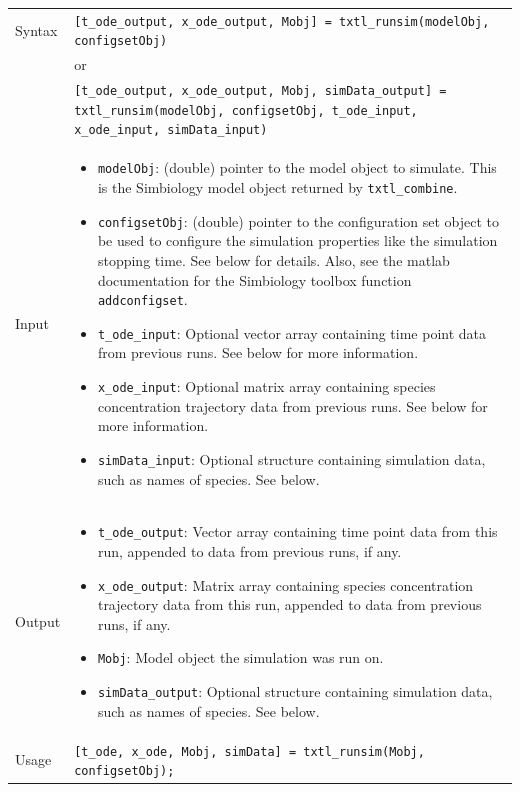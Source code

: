 \documentclass[english]{report}
\begin{document}
		\begin{tabular}{p{2cm}|p{13cm}}
			Syntax & \texttt{[t\_ode\_output, x\_ode\_output, Mobj] = txtl\_runsim(modelObj, configsetObj)}\\
			& or \\
			& \texttt{[t\_ode\_output, x\_ode\_output, Mobj, simData\_output] = txtl\_runsim(modelObj, configsetObj, t\_ode\_input, x\_ode\_input, simData\_input)}\\ \hline
			Input &  \begin{itemize}
				\item \texttt{modelObj}: (double) pointer to the model object to simulate. This is the Simbiology model object returned by \texttt{txtl\_combine}.
				\item \texttt{configsetObj}: (double) pointer to the configuration set object to be used to configure the simulation properties like the simulation stopping time. See below for details. Also, see the matlab documentation for the Simbiology toolbox function \texttt{addconfigset}. 
				\item \texttt{t\_ode\_input}: Optional vector array containing time point data from previous runs. See below for more information. 
				\item \texttt{x\_ode\_input}: Optional matrix array containing species concentration trajectory data from previous runs. See below for more information.
				\item \texttt{simData\_input}: Optional structure containing simulation data, such as names of species. See below.   
				\end{itemize} \\ \hline
			Output & \begin{itemize}
				\item \texttt{t\_ode\_output}: Vector array containing time point data from this run, appended to data from previous runs, if any. 
				\item \texttt{x\_ode\_output}: Matrix array containing species concentration trajectory data from this run, appended to data from previous runs, if any.
				\item \texttt{Mobj}: Model object the simulation was run on. 
				\item \texttt{simData\_output}: Optional structure containing simulation data, such as names of species. See below.   
				\end{itemize} \\ \hline
			Usage & \texttt{[t\_ode, x\_ode, Mobj, simData] = txtl\_runsim(Mobj, configsetObj);}\\
			\end{tabular}
			
\end{document}
